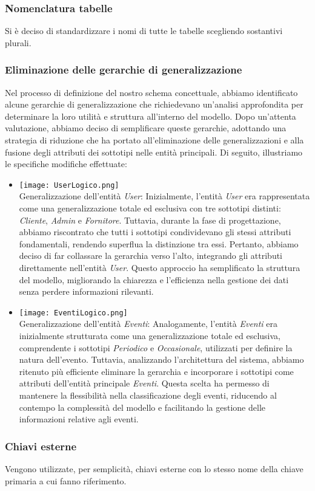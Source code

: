 \subsubsection{Nomenclatura tabelle}
Si è deciso di standardizzare i nomi di tutte le tabelle scegliendo sostantivi plurali.

\subsubsection{Eliminazione delle gerarchie di generalizzazione}
Nel processo di definizione del nostro schema concettuale, abbiamo identificato alcune gerarchie di generalizzazione che richiedevano un'analisi approfondita per determinare la loro utilità e struttura all'interno del modello. Dopo un'attenta valutazione, abbiamo deciso di semplificare queste gerarchie, adottando una strategia di riduzione che ha portato all'eliminazione delle generalizzazioni e alla fusione degli attributi dei sottotipi nelle entità principali. Di seguito, illustriamo le specifiche modifiche effettuate:

\begin{itemize} 
\item 
\texttt{[image: UserLogico.png]}\\
Generalizzazione dell’entità \textit{User}: Inizialmente, l’entità \textit{User} era rappresentata come una generalizzazione totale ed esclusiva con tre sottotipi distinti: \textit{Cliente}, \textit{Admin} e \textit{Fornitore}. Tuttavia, durante la fase di progettazione, abbiamo riscontrato che tutti i sottotipi condividevano gli stessi attributi fondamentali, rendendo superflua la distinzione tra essi. Pertanto, abbiamo deciso di far collassare la gerarchia verso l’alto, integrando gli attributi direttamente nell’entità \textit{User}. Questo approccio ha semplificato la struttura del modello, migliorando la chiarezza e l'efficienza nella gestione dei dati senza perdere informazioni rilevanti.
\item 
\texttt{[image: EventiLogico.png]}\\
Generalizzazione dell’entità \textit{Eventi}: 
Analogamente, l’entità \textit{Eventi} era inizialmente strutturata come una generalizzazione totale ed esclusiva, comprendente i sottotipi \textit{Periodico} e \textit{Occasionale}, utilizzati per definire la natura dell'evento. Tuttavia, analizzando l’architettura del sistema, abbiamo ritenuto più efficiente eliminare la gerarchia e incorporare i sottotipi come attributi dell’entità principale \textit{Eventi}. Questa scelta ha permesso di mantenere la flessibilità nella classificazione degli eventi, riducendo al contempo la complessità del modello e facilitando la gestione delle informazioni relative agli eventi.
\end{itemize}

\subsubsection{Chiavi esterne}
Vengono utilizzate, per semplicità, chiavi esterne con lo stesso nome della chiave primaria a cui fanno riferimento.




